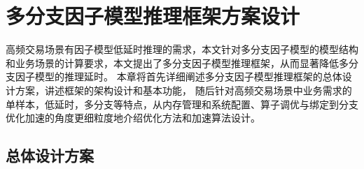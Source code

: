 \chapter{多分支因子模型推理框架方案设计}

高频交易场景有因子模型低延时推理的需求，本文针对多分支因子模型的模型结构和业务场景的计算要求，本文提出了多分支因子模型推理框架，从而显著降低多分支因子模型的推理延时。
本章将首先详细阐述多分支因子模型推理框架的总体设计方案，讲述框架的架构设计和基本功能，
随后针对高频交易场景中业务需求的单样本，低延时，多分支等特点，从内存管理和系统配置、算子调优与绑定到分支优化加速的角度更细粒度地介绍优化方法和加速算法设计。
\section{总体设计方案}

